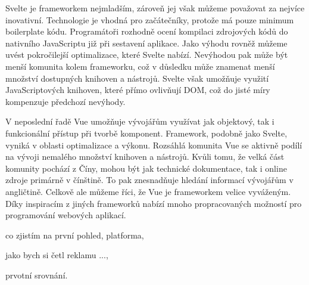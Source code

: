Svelte je frameworkem nejmladším, zároveň jej však můžeme považovat za nejvíce inovativní. 
Technologie je vhodná pro začátečníky, protože má pouze minimum boilerplate kódu. 
Programátoři rozhodně ocení kompilaci zdrojových kódů do nativního JavaScriptu již při sestavení aplikace. 
Jako výhodu rovněž můžeme uvést pokročilejší optimalizace, které Svelte nabízí. 
Nevýhodou pak může být menší komunita kolem frameworku, což v důsledku může znamenat menší množství dostupných knihoven a nástrojů. 
Svelte však umožňuje využití JavaScriptových knihoven, které přímo ovlivňují DOM, což do jisté míry kompenzuje předchozí nevýhody.

V neposlední řadě Vue umožňuje vývojářům využívat jak objektový, tak i funkcionální přístup při tvorbě komponent. 
Framework, podobně jako Svelte, vyniká v oblasti optimalizace a výkonu. Rozsáhlá komunita Vue se aktivně podílí na vývoji nemalého množství knihoven a nástrojů. 
Kvůli tomu, že velká část komunity pochází z Číny, mohou být jak technické dokumentace, tak i online zdroje primárně v čínštině. 
To pak znesnadňuje hledání informací vývojářům v angličtině. Celkově ale můžeme říci, že Vue je frameworkem velice vyváženým. 
Díky inspiracím z jiných frameworků nabízí mnoho propracovaných možností pro programování webových aplikací.

\begin{citemize}
	\item co zjistím na první pohled, platforma,
	\item jako bych si četl reklamu ...,
	\item prvotní srovnání.
\end{citemize}
